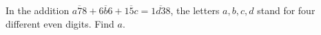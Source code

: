 In the addition $\overline{a78}+\overline{6b6}+\overline{15c}=\overline{1d38}$, the letters $a,b,c,d$ stand for four different even digits. Find $a$.
